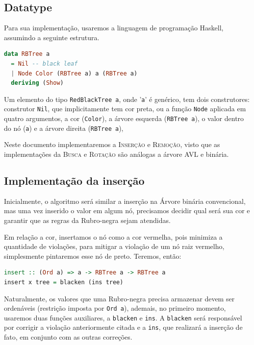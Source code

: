 \subsection{Datatype}

Para sua implementação, usaremos a linguagem de programação Haskell, assumindo a seguinte estrutura.

\begin{lstlisting}[language=haskell, caption={Árvore Rubro-Negra}]
data RBTree a
  = Nil -- black leaf
  | Node Color (RBTree a) a (RBTree a)
  deriving (Show)
\end{lstlisting}

Um elemento do tipo \texttt{RedBlackTree a}, onde '\texttt{a}' é genérico, tem dois construtores: construtor \texttt{Nil}, que implicitamente tem cor preta, ou a função \texttt{Node} aplicada em quatro argumentos, a cor (\texttt{Color}), a árvore esquerda (\texttt{RBTree a}), o valor dentro do nó (\texttt{a}) e a árvore direita (\texttt{RBTree a}),

Neste documento implementaremos a \textrm{I\textsc{nserção}} e \textrm{R\textsc{emoção}}, visto que as implementações da \textrm{B\textsc{usca}} e \textrm{R\textsc{otação}} são análogas a árvore AVL e binária.

\subsection{Implementação da inserção}


Inicialmente, o algoritmo será similar a inserção na Árvore binária convencional, mas uma vez inserido o valor em algum nó, precisamos decidir qual será sua cor e garantir que as regras da Rubro-negra sejam atendidas.

Em relação a cor, insertamos o nó como a cor vermelha, pois minimiza a quantidade de violações, para mitigar a violação de um nó raiz vermelho, simplesmente pintaremos esse nó de preto. Teremos, então:

\begin{lstlisting}[language=haskell, caption={Função principal}]
insert :: (Ord a) => a -> RBTree a -> RBTree a
insert x tree = blacken (ins tree)
\end{lstlisting}
\FloatBarrier

Naturalmente, os valores que uma Rubro-negra precisa armazenar devem ser ordenáveis (restrição imposta por \texttt{Ord a}), ademais, no primeiro momento, usaremos duas funções auxiliares, a \texttt{blacken} e \texttt{ins}. A \texttt{blacken} será responsável por corrigir a violação anteriormente citada e a \texttt{ins}, que realizará a inserção de fato, em conjunto com as outras correções.


